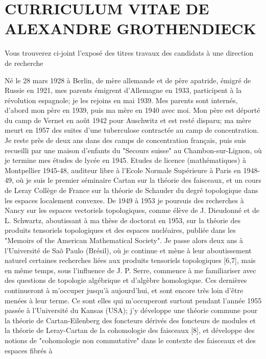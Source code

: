 \documentclass[11pt,a4paper]{article}
\begin{document}

\section{CURRICULUM VITAE DE ALEXANDRE GROTHENDIECK}


Vous trouverez ci-joint l'exposé des titres  travaux des candidats à une direction de recherche

Né le 28 mars 1928 à Berlin, de mère allemande et de père apatride, émigré de Russie en 1921, mes parents émigrent d'Allemagne en 1933, participent à la révolution espagnole; je les rejoins en mai 1939. Mes parents sont internés, d'abord mon père en 1939, puis ma mère en 1940 avec moi. Mon père est déporté du camp de Vernet en août 1942 pour Auschwitz et est resté disparu; ma mère meurt en 1957 des suites d'une tuberculose contractée au camp de concentration. Je reste près de deux ans dans des camps de concentration français, puis suis recueilli par une maison d'enfants du "Secours suisse" au Chambon-sur-Lignon, où je termine mes études de lycée en 1945. Etudes de licence (mathématiques) à Montpellier 1945-48, auditeur libre à l'Ecole Normale Supérieure à Paris en 1948-49, où je suis le premier séminaire Cartan sur la théorie des faisceaux, et un cours de Leray  Collège de France sur la théorie de Schauder du degré topologique dans les espaces localement convexes. De 1949 à 1953 je poursuis des recherches à Nancy sur les espaces vectoriels topologiques, comme élève de J. Dieudonné et de L. Schwartz, aboutissant à ma thèse de doctorat en 1953, sur la théorie des produits tensoriels topologiques et des espaces nucléaires, publiée dans les "Memoirs of the American Mathematical Society". Je passe alors deux ans à l'Université de Saõ Paulo (Brésil), où je continue et mène à leur aboutissement naturel certaines recherches liées aux produits tensoriels topologiques [6,7], mais en même temps, sous l'influence de J. P. Serre, commence à me familiariser avec des questions de topologie algébrique et d'algèbre homologique. Ces dernières continueront à m'occuper jusqu'à aujourd'hui, et sont encore très loin d'être menées à leur terme. Ce sont elles qui m'occuperont surtout pendant l'année 1955 passée à l'Université du Kansas (USA); j'y développe une théorie commune pour la théorie de Cartan-Eilenberg des foncteurs dérivés des foncteurs de modules et la théorie de Leray-Cartan de la cohomologie des faisceaux [8], et développe des notions de "cohomologie non commutative" dans le contexte des faisceaux et des espaces fibrés à
\end{document}
